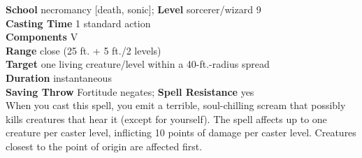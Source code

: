 \textbf{School} necromancy [death, sonic]; \textbf{Level} sorcerer/wizard 9\\
\textbf{Casting Time }1 standard action\\
\textbf{Components} V\\
\textbf{Range} close (25 ft. + 5 ft./2 levels)\\
\textbf{Target} one living creature/level within a 40-ft.-radius spread\\
\textbf{Duration} instantaneous\\
\textbf{Saving Throw} Fortitude negates; \textbf{Spell Resistance }yes\\
When you cast this spell, you emit a terrible, soul-chilling scream that possibly kills creatures that hear it (except for yourself). The spell affects up to one creature per caster level, inflicting 10 points of damage per caster level. Creatures closest to the point of origin are affected first.\\
